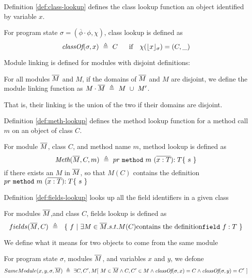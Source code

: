 Definition \ref{def:class-lookup} defines the class lookup function an object 
identified by variable $x$.
\begin{definition}
\label{def:class-lookup}
For program state $\sigma = ({\overline {\phi}}\cdot\phi, \chi)$, class lookup is defined as 
$$\class{\sigma}{x}\ \triangleq\ C \ \ \ \ \ \mbox{if} \ \ \  \chi(\interpret{\sigma}{x})=(C,\_ )$$
\end{definition}

Module linking is defined for modules with disjoint definitions:

\begin{definition}
\label{def:linking}
For all modules $\overline{M}$ and $M$, if the domains of $\overline{M}$ and $M$ are disjoint, 
we define the module linking function as $M\cdot \overline{M}\ \triangleq\ M\ \cup\ M'$.
\end{definition}
That is,  their linking is the union of the two if their domains are disjoint.

Definition \ref{def:meth-lookup} defines the method lookup function for a method
call $m$ on an object of class $C$.
\begin{definition}
\label{def:meth-lookup}
For module $\overline{M}$, class $C$, and method name $m$, method lookup is defined as 
$$\textit{Meth}(\overline{M}, C, m)\ \triangleq\ { pr}\  \mbox{\normalfont{\texttt{method}}}\ m\ (\overline{x : T}) {:T}\{\ s\ \}  $$
if there exists an $M$ in $\overline{M}$, so that $M(C)$ contains the definition ${ pr}\  \prg{method}\ m\ (\overline{x : T}) {:T}\{\ s\ \} $
\end{definition}

Definition \ref{def:fields-lookup} looks up all the field identifiers in a given class
\begin{definition}
\label{def:fields-lookup}
For modules $\overline{M}$,and  class $C$, fields lookup is defined as 
$$fields(\overline{M},C) \ \triangleq\  \  \{ \ f  \ | \  \exists  M\in\overline{M}. s.t.  M(C) \mbox{contains the definition}  \mbox{\normalfont{\texttt{field}}}\ f: T\ \} $$
\end{definition}



We define what it means for two objects to come from the same module
\begin{definition}
\label{def:same:module}
For program state $\sigma$,  modules $\overline{M}$, and variables $x$ and $y$, we defone
$$\Same {x} {y} {\sigma}{\Mtwo}\ \triangleq\ \exists C, C', M[ \ M\in \Mtwo \wedge C, C'\in M \wedge  \class{\sigma}{x}=C \wedge \class{\sigma}{y} =C'\ ]$$
\end{definition}

